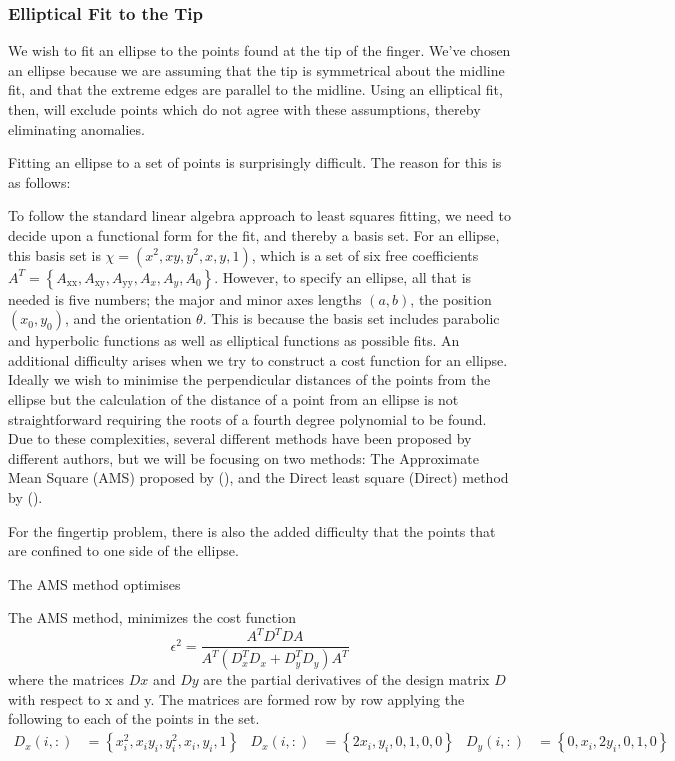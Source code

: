 \subsubsection{Elliptical Fit to the Tip}\label{sec:EllipticalFitToTheTip}
We wish to fit an ellipse to the points found at the tip of the finger. We've chosen an ellipse because we are assuming that the tip is symmetrical about the midline fit, and that the extreme edges are parallel to the midline. Using an elliptical fit, then, will exclude points which do not agree with these assumptions, thereby eliminating anomalies.

Fitting an ellipse to a set of points is surprisingly difficult. The reason for this is as follows:

To follow the standard linear algebra approach to least squares fitting, we need to decide upon a functional form for the fit, and thereby a basis set. For an ellipse, this basis set is $\chi= \left(x^2, x y, y^2, x, y, 1\right)$, which is a set of six free coefficients $ A^T=\left\{A_{\text{xx}},A_{\text{xy}},A_{\text{yy}},A_x,A_y,A_0\right\}$. However, to specify an ellipse, all that is needed is five numbers; the major and minor axes lengths $(a,b)$, the position $(x_0,y_0)$, and the orientation $\theta$. This is because the basis set includes parabolic and hyperbolic functions as well as elliptical functions as possible fits. An additional difficulty arises when we try to construct a cost function for an ellipse. Ideally we wish to minimise the perpendicular distances of the points from the ellipse but the calculation of the distance of a point from an ellipse is not straightforward requiring the roots of a fourth degree polynomial to be found. Due to these complexities, several different methods have been proposed by different authors, but we will be focusing on two methods: The Approximate Mean Square (AMS)  proposed by (\cite{Taubin1991}), and the Direct least square (Direct) method by (\cite{Fitzgibbon1999}).



For the fingertip problem, there is also the added difficulty that the points that are confined to one side of the ellipse. 

The AMS method optimises 

The AMS method,  minimizes the cost function
\begin{equation}
\epsilon ^2=\frac{ A^T D^T D A }{ A^T (D_x^T D_x +  D_y^T D_y) A^T }
\end{equation}
where the matrices $Dx$ and $Dy$ are the partial derivatives of the design matrix $D$ with respect to x and y. The matrices are formed row by row applying the following to each of the points in the set.
\begin{align}
D_x(i,:)&=\left\{x_i^2, x_i y_i, y_i^2, x_i, y_i, 1\right\} &
D_x(i,:)&=\left\{2 x_i,y_i,0,1,0,0\right\} &
D_y(i,:)&=\left\{0,x_i,2 y_i,0,1,0\right\}
\end{align}

